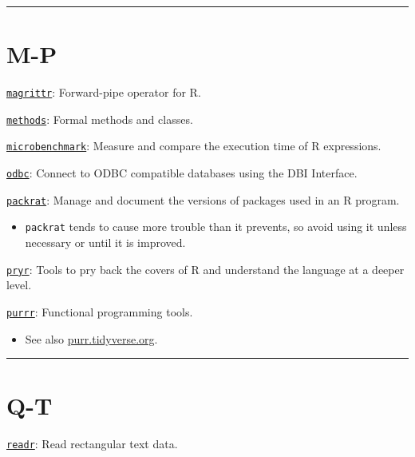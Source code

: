 \documentclass[]{book}
\providecommand{\tightlist}{%
  \setlength{\itemsep}{0pt}\setlength{\parskip}{0pt}}
\theoremstyle{definition}
\theoremstyle{definition}
\theoremstyle{definition}
\theoremstyle{remark}
\begin{document}
\begin{center}\rule{0.5\linewidth}{\linethickness}\end{center}

\section{M-P}\label{m-p}

\href{https://CRAN.R-project.org/package=magrittr}{\texttt{magrittr}}:
Forward-pipe operator for R.

\href{https://www.rdocumentation.org/packages/methods/versions/3.5.1}{\texttt{methods}}:
Formal methods and classes.

\href{https://CRAN.R-project.org/package=microbenchmark}{\texttt{microbenchmark}}:
Measure and compare the execution time of R expressions.

\href{https://CRAN.R-project.org/package=odbc}{\texttt{odbc}}: Connect
to ODBC compatible databases using the DBI Interface.

\href{https://CRAN.R-project.org/package=packrat}{\texttt{packrat}}:
Manage and document the versions of packages used in an R program.

\begin{itemize}
\tightlist
\item
  \texttt{packrat} tends to cause more trouble than it prevents, so
  avoid using it unless necessary or until it is improved.
\end{itemize}

\href{https://CRAN.R-project.org/package=pryr}{\texttt{pryr}}: Tools to
pry back the covers of R and understand the language at a deeper level.

\href{https://CRAN.R-project.org/package=purrr}{\texttt{purrr}}:
Functional programming tools.

\begin{itemize}
\tightlist
\item
  See also \href{https://purrr.tidyverse.org/}{purr.tidyverse.org}.
\end{itemize}

\begin{center}\rule{0.5\linewidth}{\linethickness}\end{center}

\section{Q-T}\label{q-t}

\href{https://CRAN.R-project.org/package=readr}{\texttt{readr}}: Read
rectangular text data.
\end{document}
